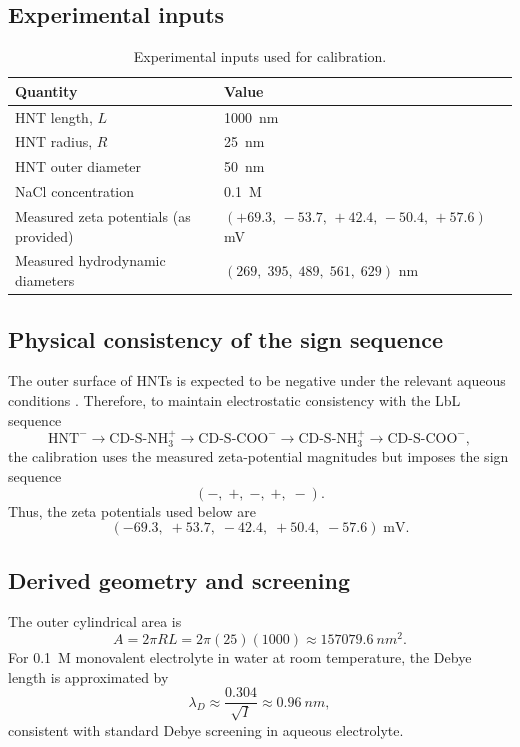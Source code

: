 \documentclass[11pt]{article}
\begin{document}
\subsection{Experimental inputs}
\begin{table}[H]
\centering
\caption{Experimental inputs used for calibration.}
\begin{tabular}{ll}
\toprule
Quantity & Value \\
\midrule
HNT length, $L$ & \SI{1000}{nm} \\
HNT radius, $R$ & \SI{25}{nm} \\
HNT outer diameter & \SI{50}{nm} \\
NaCl concentration & \SI{0.1}{M} \\
Measured zeta potentials (as provided) & $(+69.3,\,-53.7,\,+42.4,\,-50.4,\,+57.6)$ mV \\
Measured hydrodynamic diameters & $(269,\;395,\;489,\;561,\;629)$ nm \\
\bottomrule
\end{tabular}
\label{tab:inputs}
\end{table}

\subsection{Physical consistency of the sign sequence}
The outer surface of HNTs is expected to be negative under the relevant aqueous conditions \citep{Veerabadran2009,Cavallaro2020}. Therefore, to maintain electrostatic consistency with the LbL sequence
\[
\mathrm{HNT}^{-} \rightarrow \mathrm{CD\mbox{-}S\mbox{-}NH_3^+} \rightarrow \mathrm{CD\mbox{-}S\mbox{-}COO^-} \rightarrow \mathrm{CD\mbox{-}S\mbox{-}NH_3^+} \rightarrow \mathrm{CD\mbox{-}S\mbox{-}COO^-},
\]
the calibration uses the measured zeta-potential magnitudes but imposes the sign sequence
\[
(-,\; +,\; -,\; +,\; -).
\]
Thus, the zeta potentials used below are
\[
(-69.3,\; +53.7,\; -42.4,\; +50.4,\; -57.6)\;\mathrm{mV}.
\]

\subsection{Derived geometry and screening}
The outer cylindrical area is
\[
A = 2\pi R L = 2\pi(25)(1000) \approx \SI{157079.6}{nm^2}.
\]
For \SI{0.1}{M} monovalent electrolyte in water at room temperature, the Debye length is approximated by
\[
\lambda_D \approx \frac{0.304}{\sqrt{I}} \approx \SI{0.96}{nm},
\]
consistent with standard Debye screening in aqueous electrolyte.
\end{document}

